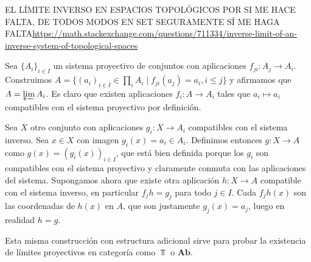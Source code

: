 \documentclass[twoside]{article}
\begin{document}
EL LÍMITE INVERSO EN ESPACIOS TOPOLÓGICOS POR SI ME HACE FALTA, DE TODOS MODOS EN SET SEGURAMENTE SÍ ME HAGA FALTA\url{https://math.stackexchange.com/questions/711334/inverse-limit-of-an-inverse-system-of-topological-spaces}

\begin{ej}\label{set}
Sea $\{A_i\}_{i\in I}$ un sistema proyectivo de conjuntos con aplicaciones $f_{ji}:A_j\to A_{i}$. Construimos $A=\{(a_i)_{i\in I}\in \prod_i A_i\mid f_{ji}(a_j)=a_i, i\leq j\}$ y afirmamos que $A=\varprojlim A_i$. Es claro que existen aplicaciones $f_i:A \to A_i$ tales que $a_i\mapsto a_i$ compatibles con el sistema proyectivo por definición.

Sea $X$ otro conjunto con aplicaciones $g_i:X\to A_i$ compatibles con el sistema inverso. Sea $x\in X$ con imagen $g_i(x)=a_i\in A_i$. Definimos entonces $g:X\to A$ como $g(x)=(g_i(x))_{i\in I}$, que está bien definida porque los $g_i$ son compatibles con el sistema proyectivo y claramente conmuta con las aplicaciones del sistema. Supongamos ahora que existe otra aplicación $h:X\to A$ compatible con el sistema inverso, en particular $f_jh=g_j$ para todo $j\in I$. Cada $f_jh(x)$ son las coordenadas de $h(x)$ en $A$, que son justamente $g_j(x)=a_j$, luego en realidad $h=g$. 

Esta misma construcción con estructura adicional sirve para probar la existencia de límites proyectivos en categoría como $\Top$ o $\mathrm{\mathbf{Ab}}$.
\end{ej}
\end{document}

